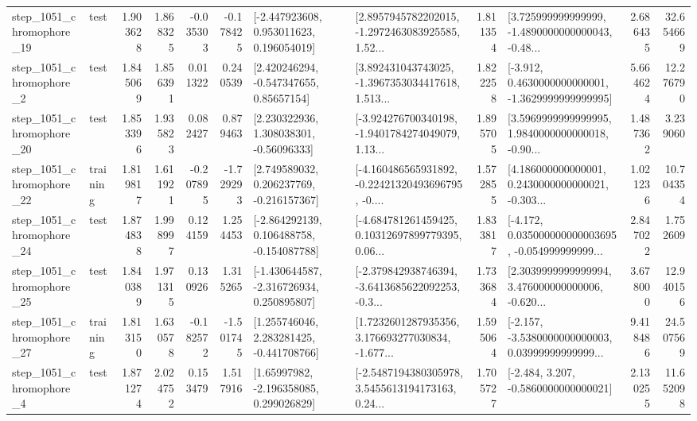 \begin{tabular}{llrrrrllrlrr}
 step\_1051\_chromophore\_19 &      test &      1.903628 &    1.868325 &     -0.035303 & -0.178425 &    [-2.447923608, 0.953011623, 0.196054019] &  [2.8957945782202015, -1.2972463083925585, 1.52... &       1.811354 &  [3.725999999999999, -1.4890000000000043, -0.48... &            2.686435 &         32.654669 \\
  step\_1051\_chromophore\_2 &      test &      1.845069 &    1.856391 &      0.011322 &  0.240539 &     [2.420246294, -0.547347655, 0.85657154] &  [3.892431043743025, -1.3967353034417618, 1.513... &       1.822258 &  [-3.912, 0.4630000000000001, -1.3629999999999995] &            5.664624 &         12.276790 \\
 step\_1051\_chromophore\_20 &      test &      1.853396 &    1.935823 &      0.082427 &  0.879463 &     [2.230322936, 1.308038301, -0.56096333] &  [-3.924276700340198, -1.9401784274049079, 1.13... &       1.895705 &  [3.5969999999999995, 1.9840000000000018, -0.90... &            1.487362 &          3.239060 \\
 step\_1051\_chromophore\_22 &  training &      1.819817 &    1.611921 &     -0.207895 & -1.729293 &    [2.749589032, 0.206237769, -0.216157367] &  [-4.160486565931892, -0.22421320493696795, -0.... &       1.572855 &  [4.186000000000001, 0.2430000000000021, -0.303... &            1.021236 &         10.704354 \\
 step\_1051\_chromophore\_24 &      test &      1.874838 &    1.998997 &      0.124159 &  1.254453 &   [-2.864292139, 0.106488758, -0.154087788] &  [-4.684781261459425, 0.10312697899779395, 0.06... &       1.833817 &  [-4.172, 0.035000000000003695, -0.054999999999... &            2.847022 &          1.752609 \\
 step\_1051\_chromophore\_25 &      test &      1.840389 &    1.971315 &      0.130926 &  1.315265 &   [-1.430644587, -2.316726934, 0.250895807] &  [-2.379842938746394, -3.6413685622092253, -0.3... &       1.733684 &  [2.3039999999999994, 3.476000000000006, -0.620... &            3.678000 &         12.940156 \\
 step\_1051\_chromophore\_27 &  training &      1.813150 &    1.630578 &     -0.182572 & -1.501745 &    [1.255746046, 2.283281425, -0.441708766] &  [1.7232601287935356, 3.176693277030834, -1.677... &       1.595064 &  [-2.157, -3.5380000000000003, 0.03999999999999... &            9.418486 &         24.507569 \\
  step\_1051\_chromophore\_4 &      test &      1.871274 &    2.024752 &      0.153479 &  1.517916 &     [1.65997982, -2.196358085, 0.299026829] &  [-2.5487194380305978, 3.5455613194173163, 0.24... &       1.705727 &               [-2.484, 3.207, -0.5860000000000021] &            2.130255 &         11.652098 \\

\end{tabular}
